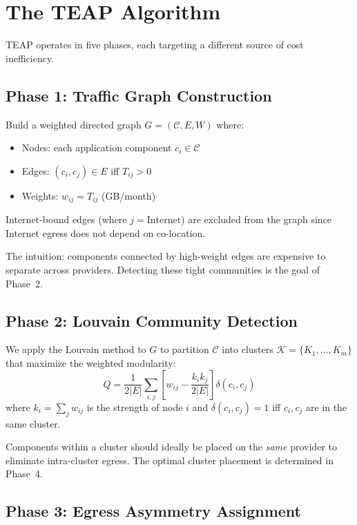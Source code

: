 \documentclass[10pt,journal,compsoc]{IEEEtran}
\begin{document}
\section{The TEAP Algorithm}
\label{sec:teap}

TEAP operates in five phases, each targeting a different source of cost
inefficiency.

\subsection{Phase 1: Traffic Graph Construction}

Build a weighted directed graph $G = (\mathcal{C}, E, W)$ where:
\begin{itemize}
  \item Nodes: each application component $c_i \in \mathcal{C}$
  \item Edges: $(c_i, c_j) \in E$ iff $T_{ij} > 0$
  \item Weights: $w_{ij} = T_{ij}$ (GB/month)
\end{itemize}
Internet-bound edges (where $j = \text{Internet}$) are excluded from the
graph since Internet egress does not depend on co-location.

The intuition: components connected by high-weight edges are expensive to
separate across providers. Detecting these tight communities is the goal of
Phase~2.

\subsection{Phase 2: Louvain Community Detection}

We apply the Louvain method \cite{blondel2008} to $G$ to partition
$\mathcal{C}$ into clusters $\mathcal{K} = \{K_1, \ldots, K_m\}$ that
maximize the weighted modularity:
\begin{equation}
Q = \frac{1}{2|E|} \sum_{i,j} \left[ w_{ij} - \frac{k_i k_j}{2|E|} \right]
    \delta(c_i, c_j)
\end{equation}
where $k_i = \sum_j w_{ij}$ is the strength of node $i$ and
$\delta(c_i, c_j) = 1$ iff $c_i, c_j$ are in the same cluster.

Components within a cluster should ideally be placed on the \emph{same}
provider to eliminate intra-cluster egress.
The optimal cluster placement is determined in Phase~4.

\subsection{Phase 3: Egress Asymmetry Assignment}
\end{document}
